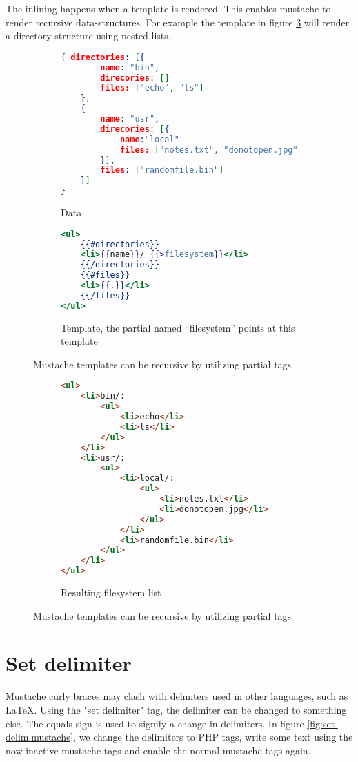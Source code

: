 \documentclass[thesis.tex]{subfiles}
\begin{document}
The inlining happens when a template is rendered. This enables mustache to
render recursive data-structures. For example the template in figure
\ref{fig:partial-example} will render a directory structure using nested lists.

\begin{figure}
	\centering
	\begin{subfigure}{\linewidth}
		\caption{Data}
		\label{fig:partial-example.data}
		\begin{lstlisting}[language=JSON]
{ directories: [{
		name: "bin",
		direcories: []
		files: ["echo", "ls"]
	},
	{
		name: "usr",
		direcories: [{
			name:"local"
			files: ["notes.txt", "donotopen.jpg"]
		}],
		files: ["randomfile.bin"]
	}]
}
		\end{lstlisting}
	\end{subfigure}
	
	\begin{subfigure}{\linewidth}
		\caption{Template, the partial named ``filesystem'' points at this template}
		\label{fig:partial-example.mustache}
		\begin{lstlisting}[language=mustache]
<ul>
	{{#directories}}
	<li>{{name}}/ {{>filesystem}}</li>
	{{/directories}}
	{{#files}}
	<li>{{.}}</li>
	{{/files}}
</ul>
		\end{lstlisting}
	\end{subfigure}
	\caption{Mustache templates can be recursive by utilizing partial tags}
	\label{fig:partial-example}
\end{figure}
	
\begin{figure}
	\ContinuedFloat
	\centering
	\begin{subfigure}{\linewidth}
		\caption{Resulting filesystem list}
		\label{fig:partial-example.html}
		\begin{lstlisting}[language=HTML]
<ul>
	<li>bin/:
		<ul>
			<li>echo</li>
			<li>ls</li>
		</ul>
	</li>
	<li>usr/:
		<ul>
			<li>local/:
				<ul>
					<li>notes.txt</li>
					<li>donotopen.jpg</li>
				</ul>
			</li>
			<li>randomfile.bin</li>
		</ul>
	</li>
</ul>
		\end{lstlisting}
	\end{subfigure}
	\caption{Mustache templates can be recursive by utilizing partial tags}
\end{figure}

\section{Set delimiter}
\label{app:mustache-set-delimiter}
Mustache curly braces may clash with delmiters used in other languages,
such as LaTeX. Using the "set delimiter" tag, the delimiter can be changed to
something else. The equals sign is used to signify a change in delimiters.
In figure \ref{fig:set-delim.mustache}, we change the delimiters
to PHP tags, write some text using the now inactive mustache tags and enable the
normal mustache tags again.
\end{document}
